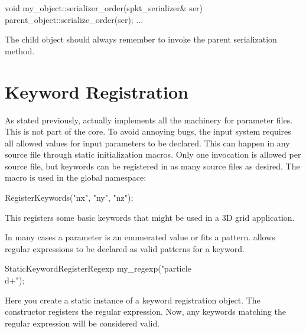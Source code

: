 \begin{CppCode}
void
my_object::serializer_order(spkt_serializer& ser)
{
  parent_object::serialize_order(ser);
  ...
}
\end{CppCode}
The child object should always remember to invoke the parent serialization method.

\section{Keyword Registration}
As stated previously, \sprockit actually implements all the machinery for parameter files.
This is not part of the \sstmacro core.
To avoid annoying bugs, the \sprockit input system requires all allowed values for input parameters to be declared.
This can happen in any source file through static initialization macros.
Only one invocation is allowed per source file,
but keywords can be registered in as many source files as desired.
The macro is used in the global namespace:

\begin{CppCode}
RegisterKeywords("nx", "ny", "nz");
\end{CppCode}
This registers some basic keywords that might be used in a 3D grid application.

In many cases a parameter is an enumerated value or fits a pattern.
\sprockit allows regular expressions to be declared as valid patterns for a keyword.

\begin{CppCode}
StaticKeywordRegisterRegexp my_regexp("particle\\d+");
\end{CppCode}
Here you create a static instance of a keyword registration object.
The constructor registers the regular expression.
Now, any keywords matching the regular expression will be considered valid.


